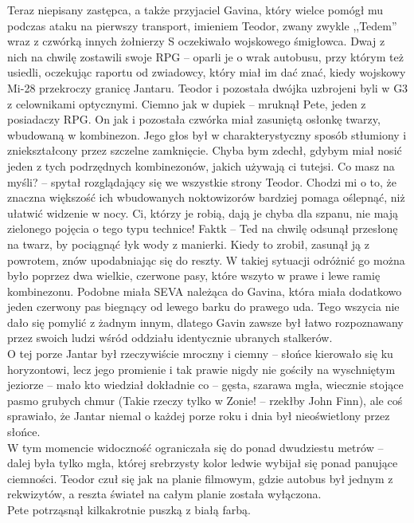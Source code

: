 \documentclass[../MAIN.tex]{subfiles}
\begin{document}
Teraz niepisany zastępca, a także przyjaciel Gavina, który wielce pomógł mu podczas ataku na pierwszy transport, imieniem Teodor, zwany zwykle ,,Tedem'' wraz z czwórką innych żołnierzy S oczekiwało wojskowego śmigłowca. Dwaj z nich na chwilę zostawili swoje RPG -- oparli je o wrak autobusu, przy którym też usiedli, oczekując raportu od zwiadowcy, który miał im dać znać, kiedy wojskowy Mi-28 przekroczy granicę Jantaru. Teodor i pozostała dwójka uzbrojeni byli w G3 z celownikami optycznymi.
\sx Ciemno jak w dupie\3k -- mruknął Pete, jeden z posiadaczy RPG.
\qd
On jak i pozostała czwórka miał zasuniętą osłonkę twarzy, wbudowaną w kombinezon.
Jego głos był w charakterystyczny sposób stłumiony i zniekształcony przez szczelne zamknięcie.
\sx Chyba bym zdechł, gdybym miał nosić jeden z tych podrzędnych kombinezonów, jakich używają ci tutejsi.
\xx Co masz na myśli? -- spytał rozglądający się we wszystkie strony Teodor.
\xx Chodzi mi o to, że znaczna większość ich wbudowanych noktowizorów bardziej pomaga oślepnąć, niż ułatwić widzenie w nocy. Ci, którzy je robią, dają je chyba dla szpanu, nie mają zielonego pojęcia o tego typu technice!
\xx Fakt\3k -- Ted na chwilę odsunął przesłonę na twarz, by pociągnąć łyk wody z manierki.
\qd
Kiedy to zrobił, zasunął ją z powrotem, znów upodabniając się do reszty. W takiej sytuacji odróżnić go można było poprzez dwa wielkie, czerwone pasy, które wszyto w prawe i lewe ramię kombinezonu. Podobne miała SEVA należąca do Gavina, która miała dodatkowo jeden czerwony pas biegnący od lewego barku do prawego uda. Tego wszycia nie dało się pomylić z żadnym innym, dlatego Gavin zawsze był łatwo rozpoznawany przez swoich ludzi wśród oddziału identycznie ubranych stalkerów.\\
O tej porze Jantar był rzeczywiście mroczny i ciemny -- słońce kierowało się ku horyzontowi, lecz jego promienie i tak prawie nigdy nie gościły na wyschniętym jeziorze -- mało kto wiedział dokładnie co -- gęsta, szarawa mgła, wiecznie stojące pasmo grubych chmur (Takie rzeczy tylko w Zonie! -- rzekłby John Finn), ale coś sprawiało, że Jantar niemal o każdej porze roku i dnia był nieoświetlony przez słońce.\\
W tym momencie widoczność ograniczała się do ponad dwudziestu metrów -- dalej była tylko mgła, której srebrzysty kolor ledwie wybijał się ponad panujące ciemności. Teodor czuł się jak na planie filmowym, gdzie autobus był jednym z rekwizytów, a reszta świateł na całym planie została wyłączona.\\
Pete potrząsnął kilkakrotnie puszką z białą farbą.
\end{document}
